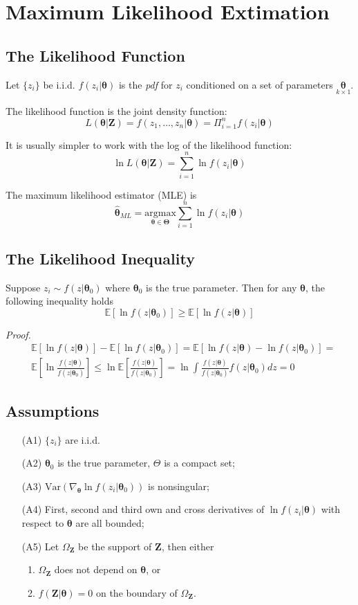 \documentclass[%
 aip,
 jmp,%
 amsmath,amssymb,
 reprint,%
]{revtex4-1}
\def\th{\theta}
\def\n{\nabla}
\def\E{\mathbb{E}}
\def\Var{\mathrm{Var}}
\def\h{\hat}
\def\l{\left}
\def\r{\right}
\newcommand{\sumn}[1]{\sum_{i=1}^{n} #1}
\newcommand{\mat}[1]{\bm{#1}}
\renewcommand{\vec}[1]{\bm{#1}}
\begin{document}
\section{Maximum Likelihood Extimation}

\subsection{The Likelihood Function}
Let $\{ z_i \}$ be i.i.d. $f(z_i | \vec\th)$ is the \emph{pdf} for $z_i$
conditioned on a set of parameters $\underset{k \times 1}{\vec\th}$.

The likelihood function is the joint density function:
$$ L(\vec\th|\vec Z) = f(z_1, \dots, z_n |\vec\th) = \Pi_{i=1}^n f(z_i|\vec\th)$$

It is usually simpler to work with the log of the likelihood function:
$$ \ln L(\vec\th|\vec Z) = \sumn \ln f(z_i|\vec\th) $$

The maximum likelihood estimator (MLE) is
$$ \vec{\h\th}_{ML} = \underset{\vec\th \in \vec\Theta}{\mathrm{argmax}} \sumn \ln f(z_i|\vec\th) $$

\subsection{The Likelihood Inequality}
Suppose $z_i \sim f(z|\vec\th_0)$ where $\vec\th_0$ is the true parameter.
Then for any $\vec\th$, the following inequality holds
$$ \E[\ln f(z|\vec\th_0)] \ge \E[\ln f(z|\vec\th)] $$

\emph{Proof.}
\begin{align*}
  &\E[\ln f(z|\vec\th)] - \E[\ln f(z|\vec\th_0)] = \E[\ln f(z|\vec\th) - \ln f(z|\vec\th_0)] = \\
  &\E\l[\ln \frac{f(z|\vec\th)}{f(z|\vec\th_0)} \r] \le \ln\E\l[ \frac{f(z|\vec\th)}{f(z|\vec\th_0)} \r]
  =\ln \int\frac{f(z|\vec\th)}{f(z|\vec\th_0)}f(z|\vec\th_0)dz = 0
\end{align*}


\subsection{Assumptions}
\begin{enumerate}
  \item [(A1)] $\{ z_i \}$ are i.i.d.
  \item [(A2)] $\vec\th_0$ is the true parameter, $\Theta$ is a compact set;
  \item [(A3)] $\Var(\n_{\vec\th} \ln f(z_i|\vec\th_0))$ is nonsingular;
  \item [(A4)] First, second and third own and cross derivatives of $\ln f(z_i|\vec\th)$ with respect to $\vec\th$ are all bounded;
  \item [(A5)] Let $\Omega_{\mat Z}$ be the support of $\mat Z$, then either
    \begin{enumerate}
      \item $\Omega_{\mat Z}$ does not depend on $\vec\th$, or
      \item $f(\vec Z|\vec\th)=0$ on the boundary of $\Omega_{\mat Z}$.
    \end{enumerate}
\end{enumerate}
\end{document}
